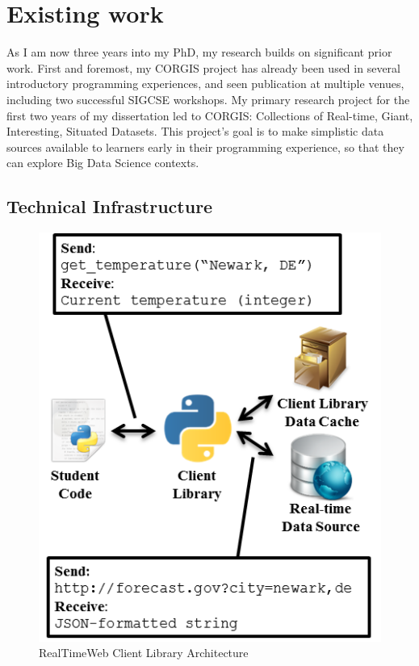 \section{Existing work}

As I am now three years into my PhD, my research builds on significant prior work. First and foremost, my CORGIS project has already been used in several introductory programming experiences, and seen publication at multiple venues, including two successful SIGCSE workshops.
My primary research project for the first two years of my dissertation led to CORGIS: Collections of Real-time, Giant, Interesting, Situated Datasets.
This project's goal is to make simplistic data sources available to learners early in their programming experience, so that they can explore Big Data Science contexts.

\subsection{Technical Infrastructure}

\begin{figure}
    \begin{center}
        \includegraphics[width=\linewidth]{images/rtw-client-library.png}
    \end{center}
    \vspace{-\bigskipamount}
    \caption{RealTimeWeb Client Library Architecture}
    \label{fig-cla}
\end{figure}

